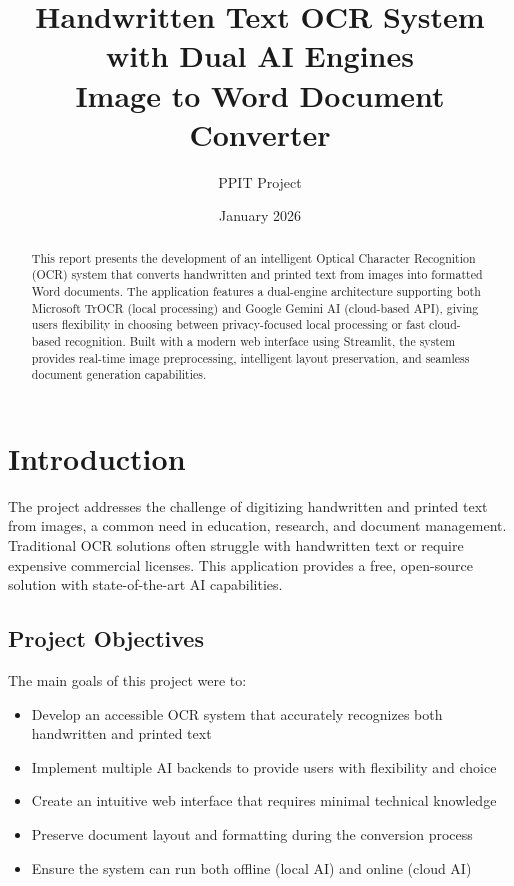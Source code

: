 \documentclass[12pt,a4paper]{article}
\title{\textbf{Handwritten Text OCR System with Dual AI Engines}\\
\large Image to Word Document Converter}
\author{PPIT Project}
\date{January 2026}
\begin{document}
\maketitle
\thispagestyle{empty}

\begin{abstract}
This report presents the development of an intelligent Optical Character Recognition (OCR) system that converts handwritten and printed text from images into formatted Word documents. The application features a dual-engine architecture supporting both Microsoft TrOCR (local processing) and Google Gemini AI (cloud-based API), giving users flexibility in choosing between privacy-focused local processing or fast cloud-based recognition. Built with a modern web interface using Streamlit, the system provides real-time image preprocessing, intelligent layout preservation, and seamless document generation capabilities.
\end{abstract}

\newpage
\tableofcontents
\newpage

\section{Introduction}

The project addresses the challenge of digitizing handwritten and printed text from images, a common need in education, research, and document management. Traditional OCR solutions often struggle with handwritten text or require expensive commercial licenses. This application provides a free, open-source solution with state-of-the-art AI capabilities.

\subsection{Project Objectives}
The main goals of this project were to:
\begin{itemize}
    \item Develop an accessible OCR system that accurately recognizes both handwritten and printed text
    \item Implement multiple AI backends to provide users with flexibility and choice
    \item Create an intuitive web interface that requires minimal technical knowledge
    \item Preserve document layout and formatting during the conversion process
    \item Ensure the system can run both offline (local AI) and online (cloud AI)
\end{itemize}
\end{document}
